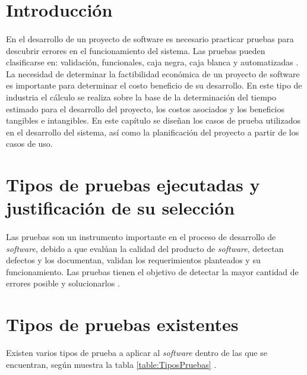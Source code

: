 
\chap{\CapCinco}

\sf
\section{Introducción}
\paragraph{}En el desarrollo de un proyecto de software es necesario practicar pruebas para descubrir errores en el funcionamiento del sistema. Las pruebas pueden clasificarse en: validación, funcionales, caja negra, caja blanca y automatizadas \cite{pittet_distintos_nodate}. La necesidad de determinar la factibilidad económica de un proyecto de software es importante para determinar el costo beneficio de su desarrollo. En este tipo de industria el cálculo se realiza sobre la base de la determinación del tiempo estimado para el desarrollo del proyecto, los costos asociados y los beneficios tangibles e intangibles. En este capítulo se diseñan los casos de prueba utilizados en el desarrollo del sistema, así como la planificación del proyecto a partir de los casos de uso.

\section{Tipos de pruebas ejecutadas y justificación de su selección}
\paragraph{}Las pruebas son un instrumento importante en el proceso de desarrollo de \textit{software}, debido a que evalúan la calidad del producto de \textit{software}, detectan defectos y los documentan, validan los requerimientos planteados y su funcionamiento. Las pruebas tienen el objetivo de detectar la mayor cantidad de errores posible y solucionarlos \cite{pittet_distintos_nodate}.

\section{Tipos de pruebas existentes}
Existen varios tipos de prueba a aplicar al \textit{software} dentro de las que se encuentran, según muestra la tabla \ref{table:TiposPruebas} \cite{quijano_que_2018}.

